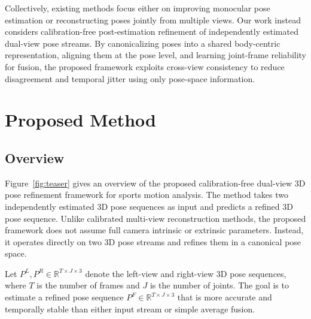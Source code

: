 \documentclass[sigconf,screen]{acmart}
\begin{document}

Collectively, existing methods focus either on improving monocular pose estimation or reconstructing poses jointly from multiple views. Our work instead considers calibration-free post-estimation refinement of independently estimated dual-view pose streams. By canonicalizing poses into a shared body-centric representation, aligning them at the pose level, and learning joint-frame reliability for fusion, the proposed framework exploits cross-view consistency to reduce disagreement and temporal jitter using only pose-space information.

\section{Proposed Method}
\label{sec:method}

\subsection{Overview}
\label{subsec:method_overview}

Figure~\ref{fig:teaser} gives an overview of the proposed calibration-free dual-view 3D pose refinement framework for sports motion analysis. The method takes two independently estimated 3D pose sequences as input and predicts a refined 3D pose sequence. Unlike calibrated multi-view reconstruction methods, the proposed framework does not assume full camera intrinsic or extrinsic parameters. Instead, it operates directly on two 3D pose streams and refines them in a canonical pose space.

Let \(P^L, P^R \in \mathbb{R}^{T \times J \times 3}\) denote the left-view and right-view 3D pose sequences, where \(T\) is the number of frames and \(J\) is the number of joints. The goal is to estimate a refined pose sequence \(P^F \in \mathbb{R}^{T \times J \times 3}\) that is more accurate and temporally stable than either input stream or simple average fusion.
\end{document}
